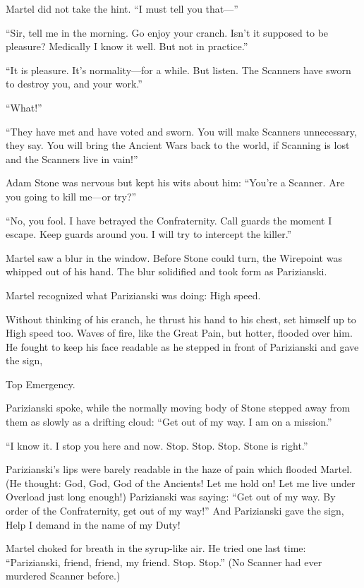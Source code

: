 Martel did not take the hint. ``I must tell you that---''

``Sir, tell me in the morning. Go enjoy your cranch. Isn't it supposed to be pleasure? Medically I know it well. But not in practice.''

``It is pleasure. It's normality---for a while. But listen. The Scanners have sworn to destroy you, and your work.''

``What!''

``They have met and have voted and sworn. You will make Scanners unnecessary, they say. You will bring the Ancient Wars back to the world, if Scanning is lost and the Scanners live in vain!''

Adam Stone was nervous but kept his wits about him: ``You're a Scanner. Are you going to kill me---or try?''

``No, you fool. I have betrayed the Confraternity. Call guards the moment I escape. Keep guards around you. I will try to intercept the killer.''

Martel saw a blur in the window. Before Stone could turn, the Wirepoint was whipped out of his hand. The blur solidified and took form as Parizianski.

Martel recognized what Parizianski was doing: High speed.

Without thinking of his cranch, he thrust his hand to his chest, set himself up to High speed too. Waves of fire, like the Great Pain, but hotter, flooded over him. He fought to keep his face readable as he stepped in front of Parizianski and gave the sign,

Top Emergency.

Parizianski spoke, while the normally moving body of Stone stepped away from them as slowly as a drifting cloud: ``Get out of my way. I am on a mission.''

``I know it. I stop you here and now. Stop. Stop. Stop. Stone is right.''

Parizianski's lips were barely readable in the haze of pain which flooded Martel. (He thought: God, God, God of the Ancients! Let me hold on! Let me live under Overload just long enough!) Parizianski was saying: ``Get out of my way. By order of the Confraternity, get out of my way!'' And Parizianski gave the sign, Help I demand in the name of my Duty!

Martel choked for breath in the syrup-like air. He tried one last time: ``Parizianski, friend, friend, my friend. Stop. Stop.'' (No Scanner had ever murdered Scanner before.)

